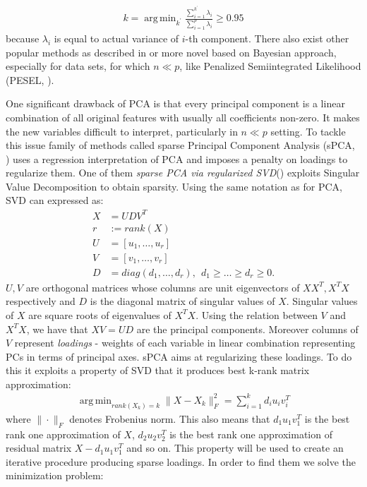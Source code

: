\documentclass[shortabstract, english, mgr]{iithesis}
\DeclareMathOperator*{\argmin}{arg\,min}
\begin{document}
\begin{align*}
    k = \argmin_{k^{\prime}} \frac{\sum_{i=1}^{k^{\prime}} \lambda_i }{\sum_{i=1}^p \lambda_i} \geq 0.95
\end{align*}
because $\lambda_i$ is equal to actual variance of $i$-th component. There also exist other popular methods as described in \cite[chapter 6]{PCA} or more novel based on Bayesian approach, especially for data sets, for which $n \ll p$, like Penalized Semiintegrated Likelihood (PESEL, \cite{pesel}). 

One significant drawback of PCA is that every principal component is a linear combination of all original features with usually all coefficients non-zero. It makes the new variables difficult to interpret, particularly in $n \ll p $ setting. To tackle this issue family of methods called sparse Principal Component Analysis (sPCA, \cite{sPCAold}) uses a regression interpretation of PCA and imposes a penalty on loadings to regularize them. One of them \textit{sparse PCA via regularized SVD}(\cite{SPCAnew}) exploits Singular Value Decomposition to obtain sparsity. Using the same notation as for PCA, SVD can expressed as:
\begin{align*}
    X &= UDV^T \\
    r &:= rank(X) \\
    U &= [u_1, \ldots, u_r] \\
    V &= [v_1, \ldots, v_r] \\
    D &= diag(d_1, \ldots, d_r), \ \ d_1 \geq \ldots \geq d_r \geq 0. 
\end{align*}
$U, V$ are orthogonal matrices whose columns are unit eigenvectors of $XX^T, X^TX$ respectively and $D$ is the diagonal matrix of singular values of $X$. Singular values of $X$ are square roots of eigenvalues of $X^TX$. Using the relation between $V$ and $X^TX$, we have that $XV = UD$ are the principal components. Moreover columns of $V$ represent \textit{loadings} - weights of each variable in linear combination representing PCs in terms of principal axes. sPCA aims at regularizing these loadings. To do this it exploits a property of SVD that it produces best k-rank matrix approximation:
\begin{align*}
    \argmin_{rank(X_k) = k}\| X - X_k \|_F^2 = \sum_{i=1}^k d_iu_iv_i^T
\end{align*} where $\| \cdot \|_F$ denotes Frobenius norm. This also means that $d_1u_1v_1^T$ is the best rank one approximation of $X$, $d_2u_2v_2^T$ is the best rank one approximation of residual matrix $X - d_1u_1v_1^T$ and so on. This property will be used to create an iterative procedure producing sparse loadings. In order to find them we solve the minimization problem:
\end{document}
